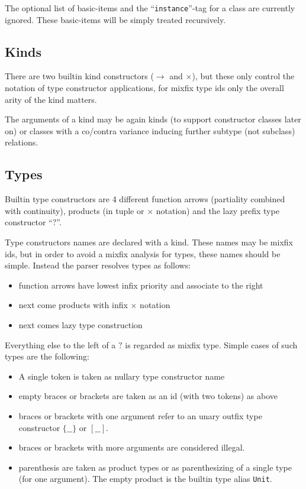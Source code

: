 \documentclass{article}
\begin{document}
The optional list of basic-items and the ``\texttt{instance}''-tag for a class
are currently ignored. These basic-items will be simply treated recursively.

\subsection{Kinds}

There are two builtin kind constructors ($\to$ and $\times$), but these only
control the notation of type constructor applications, for mixfix type ids
only the overall arity of the kind matters. 

The arguments of a kind may be again kinds (to support constructor classes
later on) or classes with a co/contra variance inducing further subtype
(not subclass) relations. 

\subsection{Types}

Builtin type constructors are 4 different function arrows (partiality combined
with continuity), products (in tuple or $\times$ notation) and the lazy
prefix type constructor ``$?$''.

Type constructors names are declared with a kind. These names may be mixfix
ids, but in order to avoid a mixfix analysis for types, these names should be
simple. Instead the parser resolves types as follows:

\begin{itemize}
\item function arrows have lowest infix priority and associate to the right
\item next come products with infix $\times$ notation
\item next comes lazy type construction
\end{itemize}

Everything else to the left of a $?$ is regarded as mixfix type. Simple cases
of such types are the following:

\begin{itemize}
\item A single token is taken as nullary type constructor name
\item empty braces or brackets are taken as an id (with two tokens) as above
\item braces or brackets with one argument refer to an unary outfix type
  constructor $\{\_\_\}$ or $[\_\_]$.
\item braces or brackets with more arguments are considered illegal.
\item parenthesis are taken as product types or as parenthesizing of a single
  type (for one argument). The empty product is the builtin type alias
  \texttt{Unit}.
\end{itemize}
\end{document}
